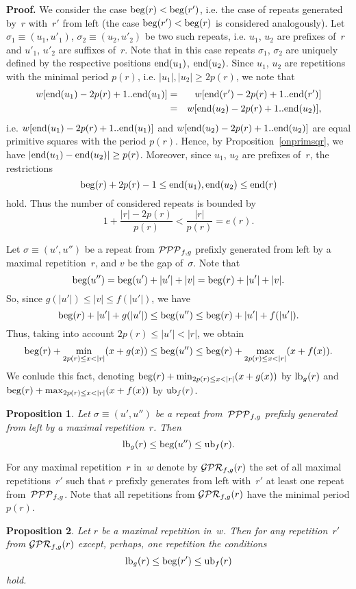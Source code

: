 \documentclass{article}
\newtheorem{proposition}{Proposition}
\begin{document}
{\bf Proof.} We consider the case ${\rm beg} (r)<{\rm beg} (r')$, i.e. 
the case of repeats generated by~$r$ with~$r'$ from left (the case 
${\rm beg} (r')<{\rm beg} (r)$ is considered analogously). Let
$\sigma_1\equiv (u_1, u'_1)$, $\sigma_2\equiv (u_2, u'_2)$
be two such repeats, i.e. $u_1$, $u_2$ are prefixes of~$r$ and
$u'_1$, $u'_2$ are suffixes of~$r$. Note that in this case repeats
$\sigma_1$, $\sigma_2$ are uniquely defined by the respective positions
${\rm end} (u_1)$, ${\rm end} (u_2)$. Since $u_1$, $u_2$ are repetitions
with the minimal period $p(r)$, i.e. $|u_1|, |u_2|\ge 2p(r)$, we note that
\begin{eqnarray*}
w[{\rm end} (u_1)-2p(r)+1..{\rm end} (u_1)]&=&w[{\rm end} (r')-2p(r)+1..{\rm end} (r')]\\
&=&w[{\rm end} (u_2)-2p(r)+1..{\rm end} (u_2)],
\end{eqnarray*}
i.e. $w[{\rm end} (u_1)-2p(r)+1..{\rm end} (u_1)]$ and $w[{\rm end} (u_2)-2p(r)+1..{\rm end} (u_2)]$
are equal primitive squares with the period $p(r)$. Hence, by Proposition~\ref{onprimsqr},
we have $|{\rm end} (u_1)-{\rm end} (u_2)|\ge p(r)$. Moreover, since $u_1$, $u_2$ are prefixes of~$r$,
the restrictions
$$
{\rm beg} (r)+2p(r)-1\le {\rm end} (u_1), {\rm end} (u_2)\le {\rm end} (r)
$$
hold. Thus the number of considered repeats is bounded by
$$
1+\frac{|r|-2p(r)}{p(r)}<\frac{|r|}{p(r)}=e(r).
$$

Let $\sigma\equiv (u', u'')$ be a repeat from ${\cal PPP}_{f,g}$ prefixly generated
from left by a maximal repetition~$r$, and $v$ be the gap of~$\sigma$.
Note that 
$$
{\rm beg} (u'')={\rm beg} (u')+|u'|+|v|={\rm beg} (r)+|u'|+|v|.
$$
So, since $g(|u'|)\le |v|\le f(|u'|)$, we have
$$
{\rm beg} (r)+|u'|+g(|u'|)\le {\rm beg} (u'')\le {\rm beg} (r)+|u'|+f(|u'|).
$$
Thus, taking into account $2p(r)\le |u'|<|r|$,  we obtain
$$
{\rm beg} (r)+\min_{2p(r)\le x<|r|}(x+g(x)) \le {\rm beg} (u'')\le
{\rm beg} (r)+\max_{2p(r)\le x<|r|}(x+f(x)).
$$
We conlude this fact, denoting ${\rm beg} (r)+\min_{2p(r)\le x<|r|}(x+g(x))$
by ${\rm lb}_g (r)$ and ${\rm beg} (r)+\max_{2p(r)\le x<|r|}(x+f(x))$ by
${\rm ub}_f (r)$.

\begin{proposition}
Let $\sigma\equiv (u', u'')$ be a repeat from~${\cal PPP}_{f,g}$ prefixly generated
from left by a maximal repetition~$r$. Then
$$
{\rm lb}_g (r)\le {\rm beg} (u'')\le {\rm ub}_f (r).
$$
\label{pronbegu}
\end{proposition}

For any maximal repetition~$r$ in~$w$ denote by ${\cal GPR}_{f,g} (r)$ the set
of all maximal repetitions~$r'$ such that $r$ prefixly generates from left
with~$r'$ at least one repeat from~${\cal PPP}_{f,g}$. Note that all
repetitions from ${\cal GPR}_{f,g} (r)$ have the minimal period $p(r)$.
\begin{proposition}
Let $r$ be a maximal repetition in~$w$. Then for any repetition~$r'$ from 
${\cal GPR}_{f,g} (r)$ except, perhaps, one repetition the conditions
$$
{\rm lb}_g (r)\le {\rm beg} (r')\le {\rm ub}_f (r)
$$
hold.
\label{prongwr}
\end{proposition}
\end{document}
